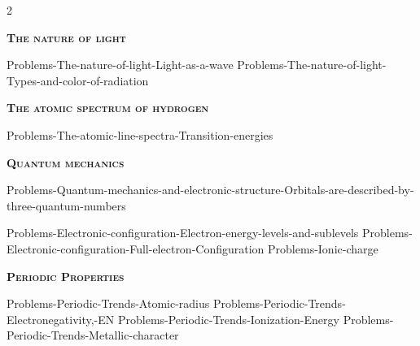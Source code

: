 \documentclass[main.tex]{subfiles}
\begin{document}
\newcommand\chapterlabel{Ch-radiation}
\newpage
{}\renewcommand{\bondwidth}{0.06642 em}  
\fancyhfoffset[E,O]{0pt}
\setlength{\columnsep}{30pt}
\begin{conclusion}
\iftoggle{chem121}{}{\setcounter{chapter}{8}}
\end{conclusion}
\begin{multicols*}{2}\setcounter{numA}{1}  %


{\raggedright\textsc{\textbf{The nature of light}}\par}
{Problems-The-nature-of-light-Light-as-a-wave}
{Problems-The-nature-of-light-Types-and-color-of-radiation}
  
{\raggedright\textsc{\textbf{The atomic spectrum of hydrogen }}\par}
{Problems-The-atomic-line-spectra-Transition-energies}

{\raggedright\textsc{\textbf{Quantum mechanics }}\par} 
{Problems-Quantum-mechanics-and-electronic-structure-Orbitals-are-described-by-three-quantum-numbers}

{Problems-Electronic-configuration-Electron-energy-levels-and-sublevels}
{Problems-Electronic-configuration-Full-electron-Configuration}
{Problems-Ionic-charge}

{\raggedright\textsc{\textbf{Periodic Properties }}\par}
  {Problems-Periodic-Trends-Atomic-radius}
  {Problems-Periodic-Trends-Electronegativity,-EN}
  {Problems-Periodic-Trends-Ionization-Energy}
  {Problems-Periodic-Trends-Metallic-character}



\end{multicols*}
\end{document}

